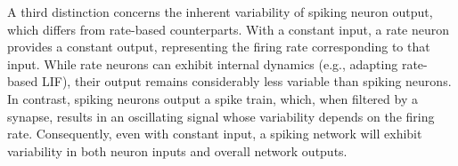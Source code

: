 


\noindent A third distinction concerns the inherent variability of spiking neuron output, which differs from rate-based counterparts. With a constant input, a rate neuron provides a constant output, representing the firing rate corresponding to that input. While rate neurons can exhibit internal dynamics (e.g., adapting rate-based LIF), their output remains considerably less variable than spiking neurons. In contrast, spiking neurons output a spike train, which, when filtered by a synapse, results in an oscillating signal whose variability depends on the firing rate. Consequently, even with constant input, a spiking network will exhibit variability in both neuron inputs and overall network outputs.\\



